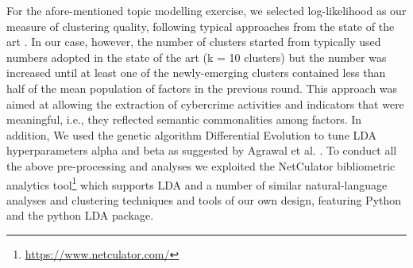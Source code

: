 For the afore-mentioned topic modelling exercise, we selected log-likelihood as our measure of clustering quality, following typical approaches from the state of the art \cite{AgrawalFM16}. In our case, however, the number of clusters started from typically used numbers adopted in the state of the art (k = 10 clusters) but the number was increased until at least one of the newly-emerging clusters contained less than half of the mean population of factors in the previous round. This approach was aimed at allowing the extraction of cybercrime activities and indicators that were meaningful, i.e., they reflected semantic commonalities among factors. In addition, We used the genetic algorithm Differential Evolution to tune LDA hyperparameters alpha and beta as suggested by Agrawal et al. \cite{AgrawalFM16}. To conduct all the above pre-processing and analyses we exploited the NetCulator bibliometric analytics tool\footnote{\url{https://www.netculator.com/}} which supports LDA and a number of similar natural-language analyses and clustering techniques and tools of our own design, featuring Python and the python LDA package.

